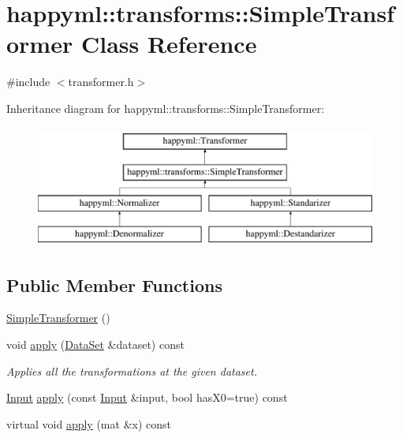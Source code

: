 \hypertarget{classhappyml_1_1transforms_1_1SimpleTransformer}{}\section{happyml\+:\+:transforms\+:\+:Simple\+Transformer Class Reference}
\label{classhappyml_1_1transforms_1_1SimpleTransformer}


{\ttfamily \#include $<$transformer.\+h$>$}

Inheritance diagram for happyml\+:\+:transforms\+:\+:Simple\+Transformer\+:\begin{figure}[H]
\begin{center}
\leavevmode
\includegraphics[height=4.000000cm]{classhappyml_1_1transforms_1_1SimpleTransformer}
\end{center}
\end{figure}
\subsection*{Public Member Functions}
\begin{DoxyCompactItemize}
\item 
\hyperlink{classhappyml_1_1transforms_1_1SimpleTransformer_aab5bd97120b0370e6fb6df1ed86f5483}{Simple\+Transformer} ()
\item 
void \hyperlink{classhappyml_1_1transforms_1_1SimpleTransformer_a7bb7863c5f6b2e0a36eac155b1f25cdf}{apply} (\hyperlink{classhappyml_1_1DataSet}{Data\+Set} \&dataset) const 
\begin{DoxyCompactList}\small\item\em Applies all the transformations at the given dataset. \end{DoxyCompactList}\item 
\hyperlink{namespacehappyml_a03602d1ec49393790b8a0449f40cd01f}{Input} \hyperlink{classhappyml_1_1transforms_1_1SimpleTransformer_a27df37bea3d873ec44ad819db60c523e}{apply} (const \hyperlink{namespacehappyml_a03602d1ec49393790b8a0449f40cd01f}{Input} \&input, bool has\+X0=true) const 
\item 
virtual void \hyperlink{classhappyml_1_1transforms_1_1SimpleTransformer_a2f38b1b4eb85dca83cb9f6ed9796da32}{apply} (mat \&x) const 
\end{DoxyCompactItemize}


